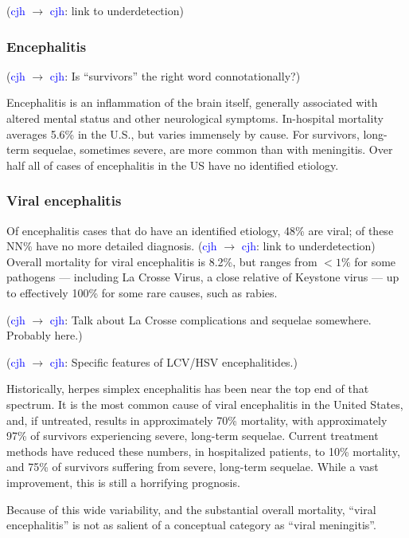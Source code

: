 \documentclass[12pt]{article}
\newcommand{\cjh}{\textcolor{blue}{cjh}}
\newcommand{\msg}[3]{(#1 $\rightarrow$ #2: #3)}
\newcommand{\mcc}[1]{\msg\cjh\cjh{#1}}
\begin{document}
            \mcc{link to underdetection}

        \subsubsection{Encephalitis}
            \mcc{Is ``survivors'' the right word connotationally?}

            Encephalitis is an inflammation of the brain itself, generally associated with altered mental status and other neurological symptoms. In-hospital mortality averages 5.6\% in the U.S., but varies immensely by cause. For survivors, long-term sequelae, sometimes severe, are more common than with meningitis. Over half all of cases of encephalitis in the US have no identified etiology.
            
        \subsubsection{Viral encephalitis}
            Of encephalitis cases that do have an identified etiology, 48\% are viral; of these NN\% have no more detailed diagnosis. \mcc{link to underdetection} Overall mortality for viral encephalitis is 8.2\%, but ranges from $<1\%$ for some pathogens --- including La Crosse Virus, a close relative of Keystone virus --- up to effectively 100\% for some rare causes, such as rabies.

            \mcc{Talk about La Crosse complications and sequelae somewhere. Probably here.}

            \mcc{Specific features of LCV/HSV encephalitides.}

            Historically, herpes simplex encephalitis has been near the top end of that spectrum. It is the most common cause of viral encephalitis in the United States, and, if untreated, results in approximately 70\% mortality, with approximately 97\% of survivors experiencing severe, long-term sequelae. Current treatment methods have reduced these numbers, in hospitalized patients, to 10\% mortality, and 75\% of survivors suffering from severe, long-term sequelae. While a vast improvement, this is still a horrifying prognosis.
            
            Because of this wide variability, and the substantial overall mortality, ``viral encephalitis'' is not as salient of a conceptual category as ``viral meningitis''. 
\end{document}
